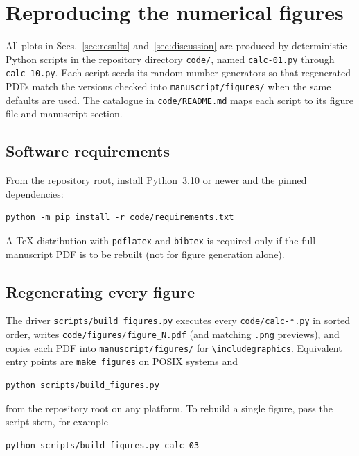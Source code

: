 
\section{Reproducing the numerical figures}
\label{app:reproducibility}

All plots in Secs.~\ref{sec:results} and~\ref{sec:discussion} are produced by
deterministic Python scripts in the repository directory \texttt{code/}, named
\texttt{calc-01.py} through \texttt{calc-10.py}.
Each script seeds its random number generators so that regenerated PDFs match
the versions checked into \texttt{manuscript/figures/} when the same defaults
are used.
The catalogue in \texttt{code/README.md} maps each script to its figure file and
manuscript section.

\subsection{Software requirements}

From the repository root, install Python~3.10 or newer and the pinned
dependencies:
\begin{verbatim}
python -m pip install -r code/requirements.txt
\end{verbatim}
A TeX distribution with \texttt{pdflatex} and \texttt{bibtex} is required only
if the full manuscript PDF is to be rebuilt (not for figure generation alone).

\subsection{Regenerating every figure}

The driver \texttt{scripts/build\_figures.py} executes every
\texttt{code/calc-*.py} in sorted order, writes \texttt{code/figures/figure\_N.pdf}
(and matching \texttt{.png} previews), and copies each PDF into
\texttt{manuscript/figures/} for \verb|\includegraphics|.
Equivalent entry points are \texttt{make figures} on POSIX systems and
\begin{verbatim}
python scripts/build_figures.py
\end{verbatim}
from the repository root on any platform.
To rebuild a single figure, pass the script stem, for example
\begin{verbatim}
python scripts/build_figures.py calc-03
\end{verbatim}

